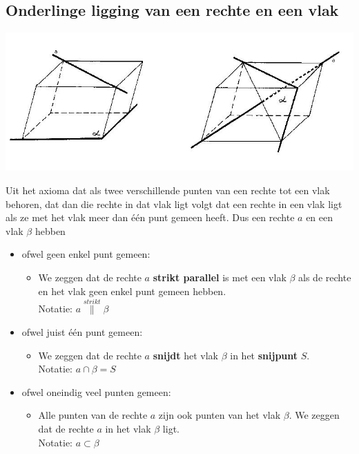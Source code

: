 \documentclass[12pt,twoside]{article}
\begin{document}
\begin{theorie}

\subsection{Onderlinge ligging van een rechte en een vlak}

\begin{center}
  \includegraphics[width=\textwidth]{onderlinge_ligging_rechte_vlak}
\end{center}

Uit het axioma dat als twee verschillende punten van een rechte tot een vlak behoren, dat dan die rechte in dat vlak ligt volgt dat een rechte in een vlak ligt als ze met het vlak meer dan één punt gemeen heeft. Dus een rechte $a$ en een vlak $\beta$ hebben
\begin{itemize}
  \item ofwel geen enkel punt gemeen:
  \begin{itemize}
    \item We zeggen dat de rechte $a$ {\bf strikt parallel} is met een vlak $\beta$ als de rechte en het vlak geen enkel punt gemeen hebben.\\
    Notatie: $a \overset{strikt}{\parallel} \beta$
  \end{itemize}
  \item ofwel juist één punt gemeen:
  \begin{itemize}
    \item We zeggen dat de rechte $a$ {\bf snijdt} het vlak $\beta$ in het {\bf snijpunt} $S$.\\
    Notatie: $a\cap \beta = S$ 
  \end{itemize}
  \item ofwel oneindig veel punten gemeen:
  \begin{itemize}
    \item Alle punten van de rechte $a$ zijn ook punten van het vlak $\beta$. We zeggen dat de rechte $a$ in het vlak $\beta$ ligt.\\
    Notatie: $a\subset\beta$
  \end{itemize}
\end{itemize}


\end{theorie}
\end{document}
